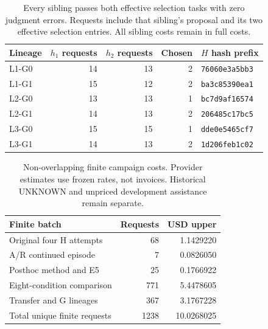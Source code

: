 \begin{table}[htbp]
\centering\small
\begin{tabular}{@{}lrrrl@{}}
\toprule
Lineage & $h_1$ requests & $h_2$ requests & Chosen & $H$ hash prefix \\
\midrule

L1-G0 & 14 & 13 & 2 & \texttt{76060e3a5bb3} \\

L1-G1 & 15 & 12 & 2 & \texttt{ba3c85390ea1} \\

L2-G0 & 13 & 13 & 1 & \texttt{bc7d9af16574} \\

L2-G1 & 14 & 13 & 2 & \texttt{206485c17bc5} \\

L3-G0 & 15 & 15 & 1 & \texttt{dde0e5465cf7} \\

L3-G1 & 14 & 13 & 2 & \texttt{1d206feb1c02} \\

\bottomrule
\end{tabular}
\caption{Every sibling passes both effective selection tasks with zero judgment errors. Requests include that sibling's proposal and its two effective selection entries. All sibling costs remain in full costs.}\label{tab:choices}
\end{table}

\begin{table}[htbp]
\centering\small
\begin{tabular}{@{}lrr@{}}
\toprule
Finite batch & Requests & USD upper \\
\midrule

Original four H attempts & 68 & 1.1429220 \\

A/R continued episode & 7 & 0.0826050 \\

Posthoc method and E5 & 25 & 0.1766922 \\

Eight-condition comparison & 771 & 5.4478605 \\

Transfer and G lineages & 367 & 3.1767228 \\

Total unique finite requests & 1238 & 10.0268025 \\

\bottomrule
\end{tabular}
\caption{Non-overlapping finite campaign costs. Provider estimates use frozen rates, not invoices. Historical UNKNOWN and unpriced development assistance remain separate.}\label{tab:costs}
\end{table}


